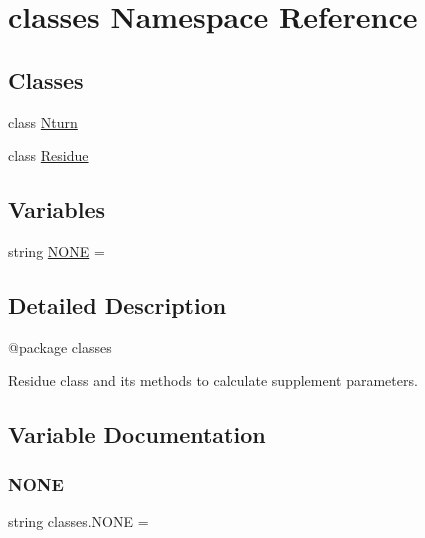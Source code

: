 \hypertarget{namespaceclasses}{}\section{classes Namespace Reference}
\label{namespaceclasses}
\subsection*{Classes}
\begin{DoxyCompactItemize}
\item 
class \hyperlink{classclasses_1_1Nturn}{Nturn}
\item 
class \hyperlink{classclasses_1_1Residue}{Residue}
\end{DoxyCompactItemize}
\subsection*{Variables}
\begin{DoxyCompactItemize}
\item 
string \hyperlink{namespaceclasses_a5e658648d8578ff1b219975886820626}{N\+O\+NE} = \textquotesingle{} \textquotesingle{}
\end{DoxyCompactItemize}


\subsection{Detailed Description}
\begin{DoxyVerb}@package classes

Residue class and its methods to calculate supplement parameters.
\end{DoxyVerb}
 

\subsection{Variable Documentation}
\mbox{\label{namespaceclasses_a5e658648d8578ff1b219975886820626}} 
\subsubsection{\texorpdfstring{N\+O\+NE}{NONE}}
{\footnotesize\ttfamily string classes.\+N\+O\+NE = \textquotesingle{} \textquotesingle{}}

